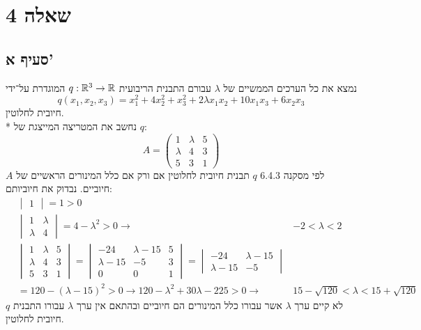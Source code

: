 \section{שאלה 4}
\subsection{סעיף א'}
נמצא את כל הערכים הממשיים של $\lambda$ עבורם התבנית הריבועית $q : \mathbb{R}^3 \to \mathbb{R}$ המוגדרת על־ידי
\[
	q(x_1, x_2, x_3) = x_1^2 + 4x_2^2 + x_3^2 + 2\lambda x_1 x_2 + 10x_1x_3 + 6x_2x_3
\]
חיובית לחלוטין. \\*
נחשב את המטריצה המייצגת של $q$:
\[
	A = \begin{pmatrix}
		1 & \lambda & 5 \\
		\lambda & 4 & 3 \\
		5 & 3 & 1
	\end{pmatrix}
\]
לפי מסקנה 6.4.3 $q$ תבנית חיובית לחלוטין אם ורק אם כלל המינורים הראשיים של $A$ חיוביים. נבדוק את חיוביותם:
\begin{align*}
	& \begin{vmatrix}
		1
	\end{vmatrix} = 1 > 0 \\
	& \begin{vmatrix}
		1 & \lambda \\
		\lambda & 4
	\end{vmatrix} = 4 - \lambda^2 > 0 \rightarrow
	& -2 < \lambda < 2 \\
	& \begin{vmatrix}
		1 & \lambda & 5 \\
		\lambda & 4 & 3 \\
		5 & 3 & 1
	\end{vmatrix}
	= \begin{vmatrix}
		-24 & \lambda - 15 & 5 \\
		\lambda - 15 & -5 & 3 \\
		0 & 0 & 1
	\end{vmatrix}
	= \begin{vmatrix}
		-24 & \lambda - 15 \\
		\lambda - 15 & -5
	\end{vmatrix} \\
	& = 120 - {(\lambda - 15)}^2 > 0
	\rightarrow 120 - \lambda^2 + 30 \lambda - 225 > 0
	\rightarrow & 15 - \sqrt{120} < \lambda < 15 + \sqrt{120}
\end{align*}
לא קיים ערך $\lambda$ אשר עבורו כלל המינורים הם חיוביים ובהתאם אין ערך $\lambda$ עבורו התבנית $q$ חיובית לחלוטין.

